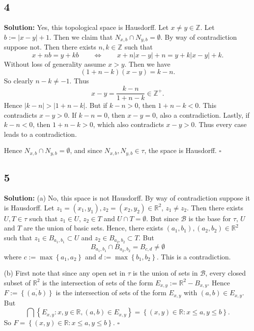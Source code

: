 \documentclass[12pt]{article}
\newcounter{ProofCounter}
\newenvironment{Solution}{\stepcounter{ProofCounter}\textbf{Solution:}}{\hfill$\square$}
\begin{document}
\newpage
\subsection*{4}
\begin{Solution}
  Yes, this topological space is Hausdorff. Let $x \neq y \in \mathbb{Z}$. Let $b := |x-y| + 1$. Then we claim that $N_{x,b} \cap N_{y,b} =
  \emptyset$. By way of contradiction suppose not. Then there exists $n,k \in \mathbb{Z}$ such that
  \[
    x + nb = y + kb \qquad \Leftrightarrow \qquad x + n|x-y| + n = y + k|x-y| + k.
  \]
  Without loss of generality assume $x > y$. Then we have 
  \[
    (1 + n-k)(x-y) = k - n.
  \]
  So clearly $n - k \neq -1$. Thus 
  \[
    x - y = \frac{k-n}{1 + n-k} \in \mathbb{Z}^+.
  \]
  Hence $|k-n| > |1 + n-k|$. But if $k - n > 0$, then $1 + n-k < 0$. This contradicts $x - y > 0$. If $k - n = 0$, then $x - y = 0$, also a
  contradiction. Lastly, if $k - n < 0$, then $1 + n - k > 0$, which also contradicts $x - y > 0$.
  Thus every case leads to a contradiction.

  Hence $N_{x,b} \cap N_{y,b} = \emptyset$, and since $N_{x,b}, N_{y,b} \in \tau$, the space is Hausdorff.
\end{Solution}


\subsection*{5}
\begin{Solution}
  (a) No, this space is not Hausdorff. By way of contradiction suppose it is Hausdorff. Let $z_1 = (x_1, y_1), z_2 = (x_2, y_2) \in \mathbb{R}^2$,
  $z_1 \neq z_2$. Then there exists $U, T \in \tau$ such that $z_1 \in U$, $z_2 \in T$ and $U \cap T = \emptyset$.
  But since $\mathcal{B}$ is the base for $\tau$, $U$ and $T$ are the union of basic sets. Hence, there exists 
  $(a_1, b_1), (a_2, b_2) \in \mathbb{R}^2$ such that $z_1 \in B_{a_1,b_1} \subset U$ and $z_2 \in B_{a_2,b_2}\subset T$. But
  \[
    B_{a_1,b_1} \cap B_{a_2,b_2} = B_{c,d} \neq \emptyset
  \]
  where $c := \max\left\{ a_1,a_2 \right\}$ and $d := \max\left\{ b_1,b_2 \right\}$. This is a contradiction.

  (b) First note that since any open set in $\tau$ is the union of sets in $\mathcal{B}$, every closed subset of $\mathbb{R}^2$ is the intersection of
  sets of the form $E_{x,y} := \mathbb{R}^2 - B_{x,y}$. Hence $F := \overline{\left\{ (a,b) \right\}}$ is the intersection of sets of the form
  $E_{x,y}$ with $(a,b) \in E_{x,y}$. But 
  \[
    \bigcap \left\{ E_{x,y} : x,y \in \mathbb{R}, (a,b) \in E_{x,y} \right\} = \left\{ (x,y) \in \mathbb{R} : x \leq a, y \leq b \right\}.
  \]
  So $F = \left\{ (x,y) \in \mathbb{R} : x \leq a, y \leq b \right\}$.
\end{Solution}
\end{document}
